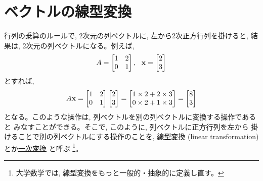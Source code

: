 \section{ベクトルの線型変換}

行列の乗算のルールで, 2次元の列ベクトルに, 左から2次正方行列を掛けると, 結果は, 2次元の列ベクトルになる。例えば, 
\begin{eqnarray}
A=\begin{bmatrix}
1 & 2 \\
0 & 1 \\
\end{bmatrix}
,\,\,\,\, 
{\bf x}=\begin{bmatrix}
2 \\
3 \\
\end{bmatrix}
\end{eqnarray}
とすれば, 
\begin{eqnarray*}
A{\bf x}=\begin{bmatrix}
1 & 2 \\
0 & 1 \\
\end{bmatrix}
\begin{bmatrix}
2 \\
3 \\
\end{bmatrix}
=\begin{bmatrix}
1\times2 + 2\times3 \\
0\times2 + 1\times3 \\
\end{bmatrix}
=\begin{bmatrix}
8 \\
3 \\
\end{bmatrix}
\end{eqnarray*}
となる。このような操作は, 列ベクトルを別の列ベクトルに変換する操作であると
みなすことができる。そこで, このように, 列ベクトルに正方行列を左から
掛けることで別の列ベクトルにする操作のことを, \underline{線型変換} 
(linear transformation)とか\underline{一次変換} と呼ぶ
\footnote{大学数学では, 線型変換をもっと一般的・抽象的に定義し直す。}。

